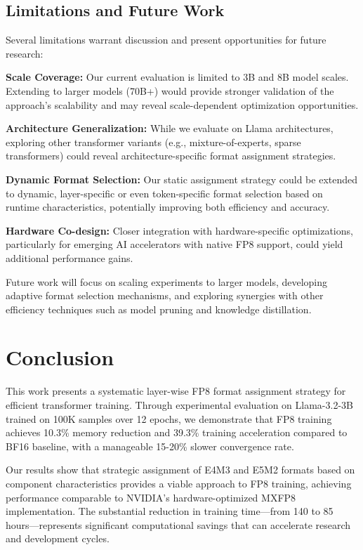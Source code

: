 \documentclass[conference]{IEEEtran}
\begin{document}
\subsection{Limitations and Future Work}

Several limitations warrant discussion and present opportunities for future research:

\textbf{Scale Coverage:} Our current evaluation is limited to 3B and 8B model scales. Extending to larger models (70B+) would provide stronger validation of the approach's scalability and may reveal scale-dependent optimization opportunities.

\textbf{Architecture Generalization:} While we evaluate on Llama architectures, exploring other transformer variants (e.g., mixture-of-experts, sparse transformers) could reveal architecture-specific format assignment strategies.

\textbf{Dynamic Format Selection:} Our static assignment strategy could be extended to dynamic, layer-specific or even token-specific format selection based on runtime characteristics, potentially improving both efficiency and accuracy.

\textbf{Hardware Co-design:} Closer integration with hardware-specific optimizations, particularly for emerging AI accelerators with native FP8 support, could yield additional performance gains.

Future work will focus on scaling experiments to larger models, developing adaptive format selection mechanisms, and exploring synergies with other efficiency techniques such as model pruning and knowledge distillation.
\section{Conclusion}

This work presents a systematic layer-wise FP8 format assignment strategy for efficient transformer training. Through experimental evaluation on Llama-3.2-3B trained on 100K samples over 12 epochs, we demonstrate that FP8 training achieves 10.3\% memory reduction and 39.3\% training acceleration compared to BF16 baseline, with a manageable 15-20\% slower convergence rate.

Our results show that strategic assignment of E4M3 and E5M2 formats based on component characteristics provides a viable approach to FP8 training, achieving performance comparable to NVIDIA's hardware-optimized MXFP8 implementation. The substantial reduction in training time—from 140 to 85 hours—represents significant computational savings that can accelerate research and development cycles.
\end{document}

